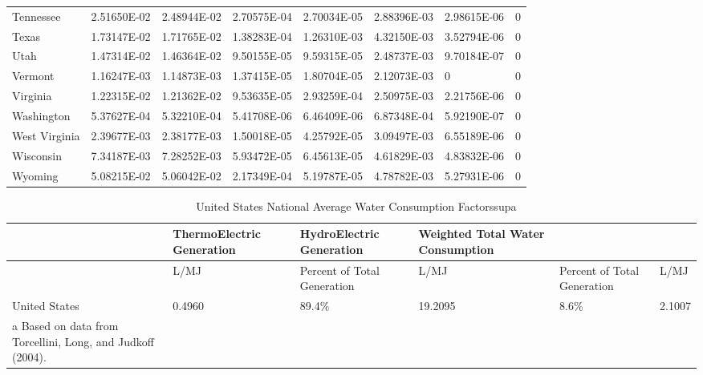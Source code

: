 \begin{longtable}[c]{p{0.75in}p{0.75in}p{0.75in}p{0.75in}p{0.75in}p{0.75in}p{0.75in}p{0.75in}}
Tennessee & 2.51650E-02 & 2.48944E-02 & 2.70575E-04 & 2.70034E-05 & 2.88396E-03 & 2.98615E-06 & 0 \tabularnewline
Texas & 1.73147E-02 & 1.71765E-02 & 1.38283E-04 & 1.26310E-03 & 4.32150E-03 & 3.52794E-06 & 0 \tabularnewline
Utah & 1.47314E-02 & 1.46364E-02 & 9.50155E-05 & 9.59315E-05 & 2.48737E-03 & 9.70184E-07 & 0 \tabularnewline
Vermont & 1.16247E-03 & 1.14873E-03 & 1.37415E-05 & 1.80704E-05 & 2.12073E-03 & 0 & 0 \tabularnewline
Virginia & 1.22315E-02 & 1.21362E-02 & 9.53635E-05 & 2.93259E-04 & 2.50975E-03 & 2.21756E-06 & 0 \tabularnewline
Washington & 5.37627E-04 & 5.32210E-04 & 5.41708E-06 & 6.46409E-06 & 6.87348E-04 & 5.92190E-07 & 0 \tabularnewline
West Virginia & 2.39677E-03 & 2.38177E-03 & 1.50018E-05 & 4.25792E-05 & 3.09497E-03 & 6.55189E-06 & 0 \tabularnewline
Wisconsin & 7.34187E-03 & 7.28252E-03 & 5.93472E-05 & 6.45613E-05 & 4.61829E-03 & 4.83832E-06 & 0 \tabularnewline
Wyoming & 5.08215E-02 & 5.06042E-02 & 2.17349E-04 & 5.19787E-05 & 4.78782E-03 & 5.27931E-06 & 0 \tabularnewline
\bottomrule
\end{longtable}

\begin{longtable}[c]{p{1.0in}p{1.0in}p{1.0in}p{1.0in}p{1.0in}p{1.0in}}
\caption{  United States National Average Water Consumption Factorssup{}a \protect \label{table:united-states-national-average-water}}\\
\toprule 
 & ThermoElectric Generation & HydroElectric Generation & Weighted Total Water Consumption \tabularnewline \midrule
\endhead
 & L/MJ & Percent of Total Generation & L/MJ & Percent of Total Generation & L/MJ \tabularnewline
United States & 0.4960 & 89.4\% & 19.2095 & 8.6\% & 2.1007 \tabularnewline
a Based on data from Torcellini, Long, and Judkoff (2004). \tabularnewline
\bottomrule
\end{longtable}

